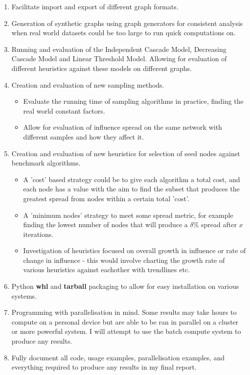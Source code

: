 \documentclass{article}
\begin{document}
\begin{enumerate}
	\item Facilitate import and export of different graph formats. \label{objimportexport}
	\item Generation of synthetic graphs using graph generators for consistent analysis when real world datasets could be too large to run quick computations on. \label{objsynthetics}
	\item Running and evaluation of the Independent Cascade Model, Decreasing Cascade Model and  Linear Threshold Model. \label{objmodels}
	      Allowing for evaluation of different heuristics against these models on different graphs.
	\item Creation and evaluation of new sampling methods. \label{objNewSampling}
	      \begin{itemize}
		      \item Evaluate the running time of sampling algorithms in practice, finding the real world constant factors.
		      \item Allow for evaluation of influence spread on the same network with different samples and how they affect it.
	      \end{itemize}
	\item Creation and evaluation of new heuristics for selection of seed nodes against benchmark algorithms.
	      \begin{itemize}
		      \item A 'cost' based strategy could be to give each algorithm a total cost, and each node has a value with the aim to find the subset that produces the greatest spread from nodes within a certain total 'cost'.
		      \item	A 'minimum nodes' strategy to meet some spread metric, for example finding the lowest number of nodes that will produce a $\delta$\% spread after $x$ iterations.
		      \item Investigation of heuristics focused on overall growth in influence or rate of change in influence - this would involve charting the growth rate of various heuristics against eachother with trendlines etc.
	      \end{itemize}
	\item Python \textbf{whl} and \textbf{tarball} packaging to allow for easy installation on various systems.
	\item Programming with parallelisation in mind.
	      Some results may take hours to compute on a personal device but are able to be ran in parallel on a cluster or more powerful system.
	      I will attempt to use the batch compute system to produce any results.
	\item Fully document all code, usage examples, parallelisation examples, and everything required to produce any results in my final report.
\end{enumerate}
\end{document}
